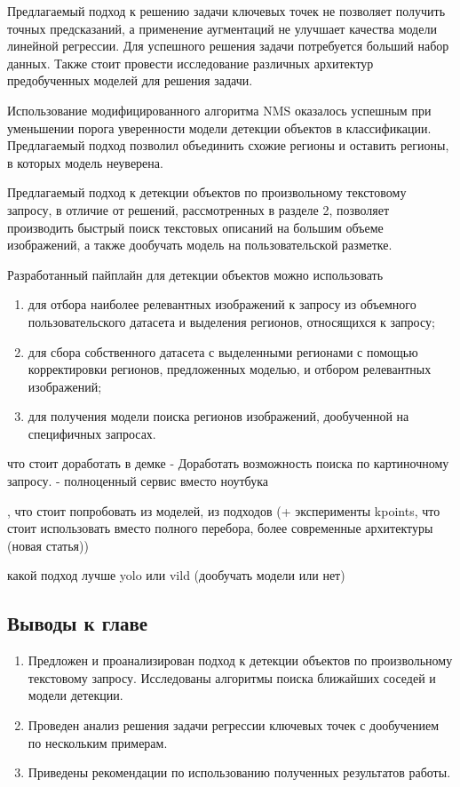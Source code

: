 \documentclass[a4paper,14pt]{article}
\begin{document}
	Предлагаемый подход к решению задачи ключевых точек не позволяет получить точных предсказаний, а применение аугментаций не улучшает качества модели линейной регрессии.
    Для успешного решения задачи потребуется больший набор данных.
    Также стоит провести исследование различных архитектур предобученных моделей для решения задачи.

	Использование модифицированного алгоритма NMS оказалось успешным при уменьшении порога уверенности модели детекции объектов в классификации. Предлагаемый подход позволил объединить схожие регионы и оставить регионы, в которых модель неуверена.
    
    Предлагаемый подход к детекции объектов по произвольному текстовому запросу, в отличие от решений, рассмотренных в разделе 2, позволяет производить быстрый поиск текстовых описаний на большим объеме изображений, а также дообучать модель на пользовательской разметке.

    Разработанный пайплайн для детекции объектов можно использовать
    \begin{enumerate}
        [1)]
        \itemsep0em
        \item для отбора наиболее релевантных изображений к запросу из объемного пользовательского датасета и выделения регионов, относящихся к запросу;
        \item для сбора собственного датасета с выделенными регионами с помощью корректировки регионов, предложенных моделью, и отбором релевантных изображений;
        \item для получения модели поиска регионов изображений, дообученной на специфичных запросах.
    \end{enumerate}

    что стоит доработать в демке
    - Доработать возможность поиска по картиночному запросу.
    - полноценный сервис вместо ноутбука
    
    , что стоит попробовать из моделей, из подходов (+ эксперименты kpoints, что стоит использовать вместо полного перебора, более современные архитектуры (новая статья))
    
    какой подход лучше yolo или vild (дообучать модели или нет)

    \subsection{Выводы к главе \thesection}
    \begin{enumerate}
        \itemsep0em
        \item Предложен и проанализирован подход к детекции объектов по произвольному текстовому запросу. Исследованы алгоритмы поиска ближайших соседей и модели детекции.
        \item Проведен анализ решения задачи регрессии ключевых точек с дообучением по нескольким примерам.
        \item Приведены рекомендации по использованию полученных результатов работы.
    \end{enumerate}
\end{document}
